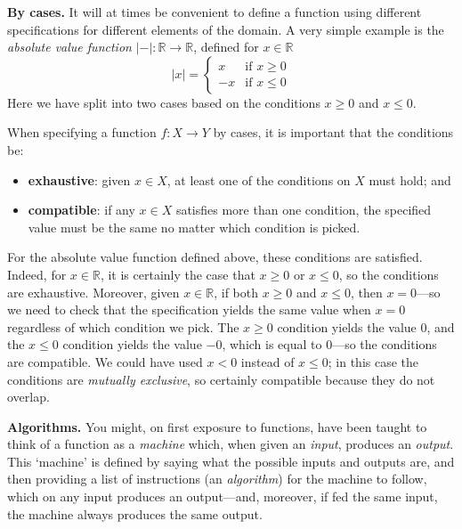 \textbf{By cases.} It will at times be convenient to define a function using different specifications for different elements of the domain.  A very simple example is the \textit{absolute value function} $|{-}| : \mathbb{R} \to \mathbb{R}$, defined for $x \in \mathbb{R}$
\[ |x| = \begin{cases} x & \text{if } x \ge 0 \\ -x & \text{if } x \le 0 \end{cases} \]
Here we have split into two cases based on the conditions $x \ge 0$ and $x \le 0$.

When specifying a function $f : X \to Y$ by cases, it is important that the conditions be:
\begin{itemize}
\item \textbf{exhaustive}: given $x \in X$, at least one of the conditions on $X$ must hold; and
\item \textbf{compatible}: if any $x \in X$ satisfies more than one condition, the specified value must be the same no matter which condition is picked.
\end{itemize}

For the absolute value function defined above, these conditions are satisfied. Indeed, for $x \in \mathbb{R}$, it is certainly the case that $x \ge 0$ or $x \le 0$, so the conditions are exhaustive. Moreover, given $x \in \mathbb{R}$, if both $x \ge 0$ and $x \le 0$, then $x=0$---so we need to check that the specification yields the same value when $x=0$ regardless of which condition we pick. The $x \ge 0$ condition yields the value $0$, and the $x \le 0$ condition yields the value $-0$, which is equal to $0$---so the conditions are compatible. We could have used $x<0$ instead of $x \le 0$; in this case the conditions are \textit{mutually exclusive}, so certainly compatible because they do not overlap.

\textbf{Algorithms.} You might, on first exposure to functions, have been taught to think of a function as a \textit{machine} which, when given an \textit{input}, produces an \textit{output}. This `machine' is defined by saying what the possible inputs and outputs are, and then providing a list of instructions (an \textit{algorithm}) for the machine to follow, which on any input produces an output---and, moreover, if fed the same input, the machine always produces the same output. 

